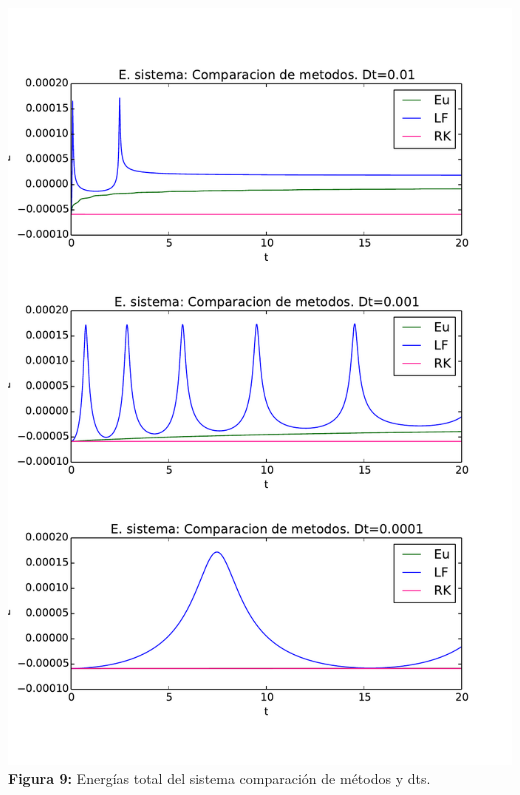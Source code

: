 \documentclass[11pt,letterpaper]{exam}
\begin{document}
\begin{center}
\includegraphics[width=16.cm]{Enertotal_met_dt.pdf}
\textbf{Figura 9:}{  Energ\'ias total del sistema comparaci\'on de m\'etodos y dts.}
\end{center}
\end{document}
